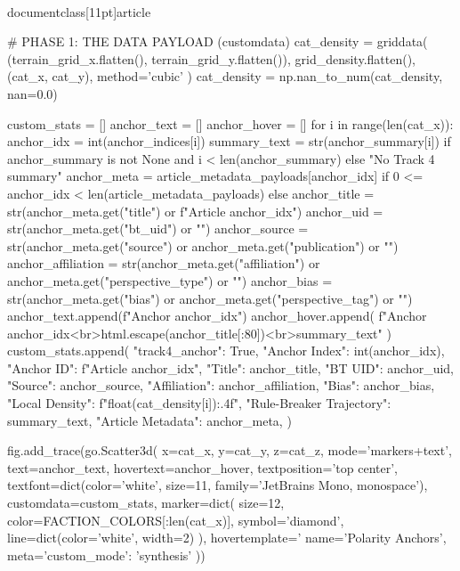 \\documentclass[11pt]{article}
\begin{document}
\begin{CodeBlock}
{{{{{                # PHASE 1: THE DATA PAYLOAD (customdata)
                cat_density = griddata(
                    (terrain_grid_x.flatten(), terrain_grid_y.flatten()),
                    grid_density.flatten(),
                    (cat_x, cat_y),
                    method='cubic'
                )
                cat_density = np.nan_to_num(cat_density, nan=0.0)
                
                custom_stats = []
                anchor_text = []
                anchor_hover = []
                for i in range(len(cat_x)):
                    anchor_idx = int(anchor_indices[i])
                    summary_text = str(anchor_summary[i]) if anchor_summary is not None and i < len(anchor_summary) else "No Track 4 summary"
                    anchor_meta = article_metadata_payloads[anchor_idx] if 0 <= anchor_idx < len(article_metadata_payloads) else {}
                    anchor_title = str(anchor_meta.get("title") or f"Article {anchor_idx}")
                    anchor_uid = str(anchor_meta.get("bt_uid") or "")
                    anchor_source = str(anchor_meta.get("source") or anchor_meta.get("publication") or "")
                    anchor_affiliation = str(anchor_meta.get("affiliation") or anchor_meta.get("perspective_type") or "")
                    anchor_bias = str(anchor_meta.get("bias") or anchor_meta.get("perspective_tag") or "")
                    anchor_text.append(f"Anchor {anchor_idx}")
                    anchor_hover.append(
                        f"Anchor {anchor_idx}<br>{html.escape(anchor_title[:80])}<br>{summary_text}"
                    )
                    custom_stats.append({
                        "track4_anchor": True,
                        "Anchor Index": int(anchor_idx),
                        "Anchor ID": f"Article {anchor_idx}",
                        "Title": anchor_title,
                        "BT UID": anchor_uid,
                        "Source": anchor_source,
                        "Affiliation": anchor_affiliation,
                        "Bias": anchor_bias,
                        "Local Density": f"{float(cat_density[i]):.4f}",
                        "Rule-Breaker Trajectory": summary_text,
                        "Article Metadata": anchor_meta,
                    })
                
                fig.add_trace(go.Scatter3d(
                    x=cat_x, y=cat_y, z=cat_z,
                    mode='markers+text',
                    text=anchor_text,
                    hovertext=anchor_hover,
                    textposition='top center',
                    textfont=dict(color='white', size=11, family='JetBrains Mono, monospace'),
                    customdata=custom_stats,
                    marker=dict(
                        size=12,
                        color=FACTION_COLORS[:len(cat_x)],
                        symbol='diamond',
                        line=dict(color='white', width=2)
                    ),
                    hovertemplate='%
                    name='Polarity Anchors',
                    meta={'custom_mode': 'synthesis'}
                ))

}}}}}
\end{CodeBlock}
\end{document}

